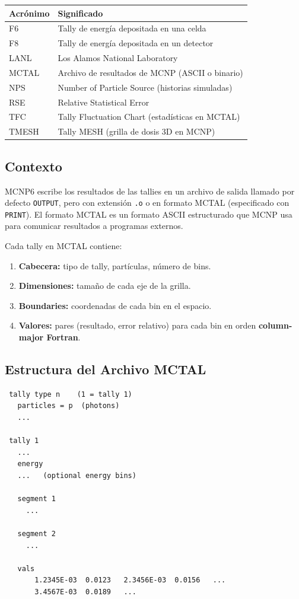 \documentclass[12pt,a4paper]{article}
\begin{document}
\begin{tabular}{p{3cm} p{12cm}}
\toprule
\textbf{Acrónimo} & \textbf{Significado} \\
\midrule
F6 & Tally de energía depositada en una celda \\
F8 & Tally de energía depositada en un detector \\
LANL & Los Alamos National Laboratory \\
MCTAL & Archivo de resultados de MCNP (ASCII o binario) \\
NPS & Number of Particle Source (historias simuladas) \\
RSE & Relative Statistical Error \\
TFC & Tally Fluctuation Chart (estadísticas en MCTAL) \\
TMESH & Tally MESH (grilla de dosis 3D en MCNP) \\
\bottomrule
\end{tabular}

\subsection{Contexto}

MCNP6 escribe los resultados de las tallies en un archivo de salida llamado por defecto \texttt{OUTPUT}, pero con extensión \texttt{.o} o en formato MCTAL (especificado con \texttt{PRINT}). El formato MCTAL es un formato ASCII estructurado que MCNP usa para comunicar resultados a programas externos.

Cada tally en MCTAL contiene:
\begin{enumerate}
  \item \textbf{Cabecera:} tipo de tally, partículas, número de bins.
  \item \textbf{Dimensiones:} tamaño de cada eje de la grilla.
  \item \textbf{Boundaries:} coordenadas de cada bin en el espacio.
  \item \textbf{Valores:} pares (resultado, error relativo) para cada bin en orden \textbf{column-major Fortran}.
\end{enumerate}

\subsection{Estructura del Archivo MCTAL}

\begin{verbatim}
 tally type n    (1 = tally 1)
   particles = p  (photons)
   ...

 tally 1
   ...
   energy
   ...   (optional energy bins)

   segment 1
     ...

   segment 2
     ...

   vals
       1.2345E-03  0.0123   2.3456E-03  0.0156   ...
       3.4567E-03  0.0189   ...
\end{verbatim}
\end{document}
